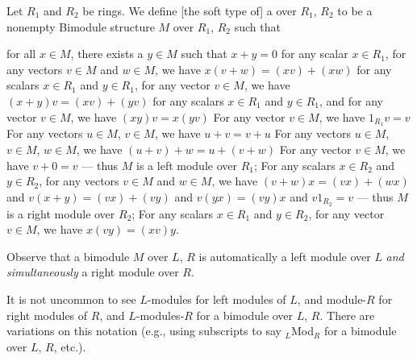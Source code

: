 \begin{definition}
Let $R_{1}$ and $R_{2}$ be rings.
We define [the soft type of] a  over $R_{1}$, $R_{2}$
to be a nonempty Bimodule structure $M$ over $R_{1}$, $R_{2}$ such
that
\begin{itemize}
 for all $x\in M$, there exists a $y\in M$ such that $x+y=0$
 for any scalar
$x\in R_{1}$, for any vectors $v\in M$ and $w\in M$, we have $x(v+w)=(xv)+(xw)$
 for any scalars
$x\in R_{1}$ and $y\in R_{1}$, for any vector $v\in M$, we have $(x+y)v=(xv)+(yv)$
 for any scalars
$x\in R_{1}$ and $y\in R_{1}$, and for any vector $v\in M$, we have $(xy)v=x(yv)$
 For any vector $v\in M$, we have $1_{R_{1}}v=v$
 For any vectors
$u\in M$, $v\in M$, we have $u+v=v+u$
 For any vectors
$u\in M$, $v\in M$, $w\in M$, we have $(u+v)+w=u+(v+w)$
 For any vector $v\in M$,
we have $v+0=v$ --- thus $M$ is a left module over $R_{1}$;
 For any scalars $x\in R_{2}$
and $y\in R_{2}$, for any vectors $v\in M$ and $w\in M$, we have
$(v+w)x=(vx)+(wx)$ and $v(x+y)=(vx)+(vy)$ and $v(yx)=(vy)x$ and $v1_{R_{2}}=v$
--- thus $M$ is a right module over $R_{2}$;
 For any scalars $x\in R_{1}$
and $y\in R_{2}$, for any vector $v\in M$, we have $x(vy)=(xv)y$.
\end{itemize}
\end{definition}

\begin{remark}
Observe that a bimodule $M$ over $L$, $R$ is automatically a left
module over $L$ \emph{and simultaneously} a right module over $R$.
\end{remark}

\begin{remark}
It is not uncommon to see $L$-modules for left modules of $L$, and
module-$R$ for right modules of $R$, and $L$-modules-$R$ for a
bimodule over $L$, $R$. There are variations on this notation (e.g.,
using subscripts to say ${}_{L}$Mod${}_{R}$ for a bimodule over $L$,
$R$, etc.).
\end{remark}

